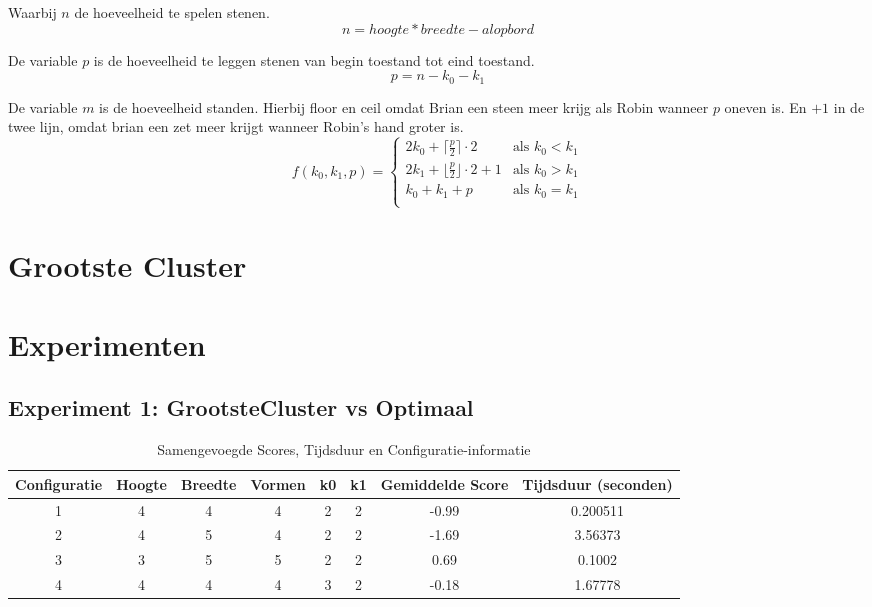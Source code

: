 \documentclass[10pt]{article}
\begin{document}
Waarbij $n$ de hoeveelheid te spelen stenen.
\begin{equation}
    n = hoogte * breedte - alopbord
\end{equation}

De variable $p$ is de hoeveelheid te leggen stenen van begin toestand tot eind toestand.
\begin{equation}
    p = n - k_0 - k_1
\end{equation}

De variable $m$ is de hoeveelheid standen. Hierbij floor en ceil omdat Brian een steen meer krijg als Robin wanneer $p$ oneven is. En $+1$ in de twee lijn, omdat brian een zet meer krijgt wanneer Robin's hand groter is.
\begin{equation}
    f(k_0, k_1, p) = \begin{cases} 
    2k_0 + \lceil \frac{p}{2} \rceil \cdot 2 & \text{als } k_0 < k_1 \\
    2k_1 + \lfloor \frac{p}{2} \rfloor \cdot 2 + 1 & \text{als } k_0 > k_1 \\
    k_0 + k_1 + p & \text{als } k_0 = k_1 \\ 
\end{cases}
\end{equation}


\section{Grootste Cluster}

\section{Experimenten}

\subsection{Experiment 1: GrootsteCluster vs Optimaal}

\begin{table}[h]
    \centering
    \caption{Samengevoegde Scores, Tijdsduur en Configuratie-informatie}
    \begin{tabular}{@{}cccccccc@{}}
        \toprule
        Configuratie & Hoogte & Breedte & Vormen & k0 & k1 & Gemiddelde Score & Tijdsduur (seconden) \\ 
        \midrule
        1 & 4 & 4 & 4 & 2 & 2 & -0.99 & 0.200511 \\
        2 & 4 & 5 & 4 & 2 & 2 & -1.69 & 3.56373 \\
        3 & 3 & 5 & 5 & 2 & 2 & 0.69 & 0.1002 \\
        4 & 4 & 4 & 4 & 3 & 2 & -0.18 & 1.67778 \\ 
        \bottomrule
    \end{tabular}
\end{table}
\FloatBarrier
\end{document}
